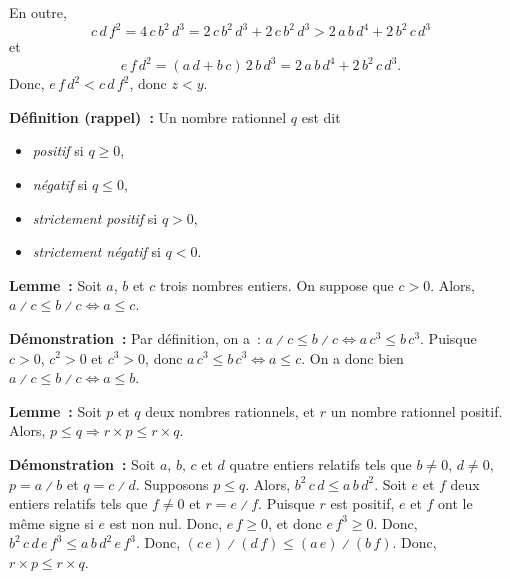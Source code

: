     En outre, 
    \begin{equation*}
        c \, d \, f^2 
        = 4 \, c \, b^2 \, d^3
        = 2 \, c \, b^2 \, d^3 + 2 \, c \, b^2 \, d^3
        > 2 \, a \, b \, d^4 + 2 \, b^2 \, c \, d^3 
    \end{equation*}
    et 
    \begin{equation*}
        e \, f \, d^2
        = (a \, d + b \, c) \, 2 \, b \, d^3
        = 2 \, a \, b \, d^4 + 2 \, b^2 \, c \, d^3. 
    \end{equation*}
    Donc, $e \, f \, d^2 < c \, d \, f^2$, donc $z < y$.

    \done

\medskip

\noindent\textbf{Définition (rappel) :} Un nombre rationnel $q$ est dit
    \begin{itemize}[nosep]
        \item \emph{positif} si $q \geq 0$,
        \item \emph{négatif} si $q \leq 0$,
        \item \emph{strictement positif} si $q > 0$,
        \item \emph{strictement négatif} si $q < 0$.
    \end{itemize}

\medskip

\noindent\textbf{Lemme :} Soit $a$, $b$ et $c$ trois nombres entiers.
    On suppose que $c > 0$.
    Alors, $a \divslash c \leq b \divslash c \Leftrightarrow a \leq c$.

\medskip

\noindent\textbf{Démonstration :} Par définition, on a : $a \divslash c \leq b \divslash c \Leftrightarrow a \, c^3 \leq b \, c^3$.
    Puisque $c > 0$, $c^2 > 0$ et $c^3 > 0$, donc $a \, c^3 \leq b \, c^3 \Leftrightarrow a \leq c$.
    On a donc bien $a \divslash c \leq b \divslash c \Leftrightarrow a \leq b$.

    \done

\medskip

\noindent\textbf{Lemme :} Soit $p$ et $q$ deux nombres rationnels, et $r$ un nombre rationnel positif. 
    Alors, $p \leq q \Rightarrow r \times p \leq r \times q$.

\medskip

\noindent\textbf{Démonstration :}
    Soit $a$, $b$, $c$ et $d$ quatre entiers relatifs tels que $b \neq 0$, $d \neq 0$, $p = a \divslash b$ et $q = c \divslash d$.
    Supposons $p \leq q$.
    Alors, $b^2 \, c \, d \leq a \, b \, d^2$.
    Soit $e$ et $f$ deux entiers relatifs tels que $f \neq 0$ et $r = e \divslash f$.
    Puisque $r$ est positif, $e$ et $f$ ont le même signe si $e$ est non nul. 
    Donc, $e \, f \geq 0$, et donc $e \, f^3 \geq 0$.
    Donc, $b^2 \, c \, d \, e \, f^3 \leq a \, b \, d^2 \, e \, f^3$. 
    Donc, $(c \, e) \divslash (d \, f) \leq (a \, e) \divslash (b \, f)$. 
    Donc, $r \times p \leq r \times q$.

